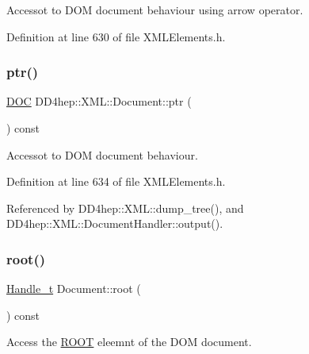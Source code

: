 Accessot to D\+OM document behaviour using arrow operator. 



Definition at line 630 of file X\+M\+L\+Elements.\+h.

\hypertarget{class_d_d4hep_1_1_x_m_l_1_1_document_a2673a02ca3e0e960766103c1714f1de9}{}\label{class_d_d4hep_1_1_x_m_l_1_1_document_a2673a02ca3e0e960766103c1714f1de9} 
\subsubsection{\texorpdfstring{ptr()}{ptr()}}
{\footnotesize\ttfamily \hyperlink{class_d_d4hep_1_1_x_m_l_1_1_document_a685ff83de83e9b7b37e79ad846fc2387}{D\+OC} D\+D4hep\+::\+X\+M\+L\+::\+Document\+::ptr (\begin{DoxyParamCaption}{ }\end{DoxyParamCaption}) const\hspace{0.3cm}{\ttfamily [inline]}}



Accessot to D\+OM document behaviour. 



Definition at line 634 of file X\+M\+L\+Elements.\+h.



Referenced by D\+D4hep\+::\+X\+M\+L\+::dump\+\_\+tree(), and D\+D4hep\+::\+X\+M\+L\+::\+Document\+Handler\+::output().

\hypertarget{class_d_d4hep_1_1_x_m_l_1_1_document_a27c53d4bc74da0b3a185dc3e3d16a36c}{}\label{class_d_d4hep_1_1_x_m_l_1_1_document_a27c53d4bc74da0b3a185dc3e3d16a36c} 
\subsubsection{\texorpdfstring{root()}{root()}}
{\footnotesize\ttfamily \hyperlink{class_d_d4hep_1_1_x_m_l_1_1_handle__t}{Handle\+\_\+t} Document\+::root (\begin{DoxyParamCaption}{ }\end{DoxyParamCaption}) const}



Access the \hyperlink{namespace_r_o_o_t}{R\+O\+OT} eleemnt of the D\+OM document. 



